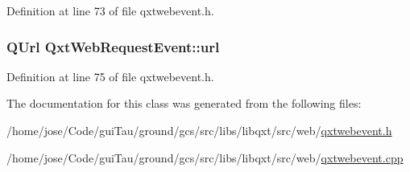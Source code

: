 Definition at line 73 of file qxtwebevent.\-h.

\hypertarget{class_qxt_web_request_event_a7478ca98a01fddf7b22b4c0f79c9d0a8}{
\subsubsection[{url}]{\setlength{\rightskip}{0pt plus 5cm}Q\-Url Qxt\-Web\-Request\-Event\-::url}}\label{class_qxt_web_request_event_a7478ca98a01fddf7b22b4c0f79c9d0a8}


Definition at line 75 of file qxtwebevent.\-h.



The documentation for this class was generated from the following files\-:\begin{DoxyCompactItemize}
\item 
/home/jose/\-Code/gui\-Tau/ground/gcs/src/libs/libqxt/src/web/\hyperlink{qxtwebevent_8h}{qxtwebevent.\-h}\item 
/home/jose/\-Code/gui\-Tau/ground/gcs/src/libs/libqxt/src/web/\hyperlink{qxtwebevent_8cpp}{qxtwebevent.\-cpp}\end{DoxyCompactItemize}
